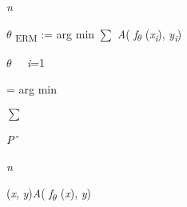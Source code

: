 \documentclass[12pt,twoside]{article}
\begin{document}
\begin{adjustwidth}{0.38in}{0.0in}
\begin{Center}
{\fontsize{7pt}{8.4pt}\selectfont \textit{n}\par}
\end{Center}\par

\end{adjustwidth}

\begin{adjustwidth}{0.85in}{0.76in}
\begin{Center}
{\fontsize{10pt}{12.0pt}\selectfont \textit{$ \theta $ }\textsubscript{ERM} := arg min $ \sum $  \textit{A}( \textit{f\textsubscript{$ \theta $ } }(\textit{x\textsubscript{i}}), \textit{y\textsubscript{i}})\par}
\end{Center}\par

\end{adjustwidth}

\begin{adjustwidth}{0.85in}{0.63in}
\begin{Center}
{\fontsize{7pt}{8.4pt}\selectfont \textit{$ \theta $ \ \  i}=1\par}
\end{Center}\par

\end{adjustwidth}

\begin{adjustwidth}{3.01in}{0.0in}
\begin{FlushLeft}
{\fontsize{10pt}{12.0pt}\selectfont = arg min  {\fontsize{14pt}{16.8pt}\selectfont $ \sum $  {\fontsize{10pt}{12.0pt}\selectfont \textit{P}$ \string^ $ {\fontsize{7pt}{8.4pt}\selectfont \textit{n}{\fontsize{10pt}{12.0pt}\selectfont (\textit{x}, \textit{y})\textit{A}( \textit{f\textsubscript{$ \theta $ } }(\textit{x}), \textit{y})\par}\par}\par}\par}\par}
\end{FlushLeft}\par

\end{adjustwidth}

\begin{adjustwidth}{3.65in}{0.0in}
\par

\end{adjustwidth}
\end{document}
